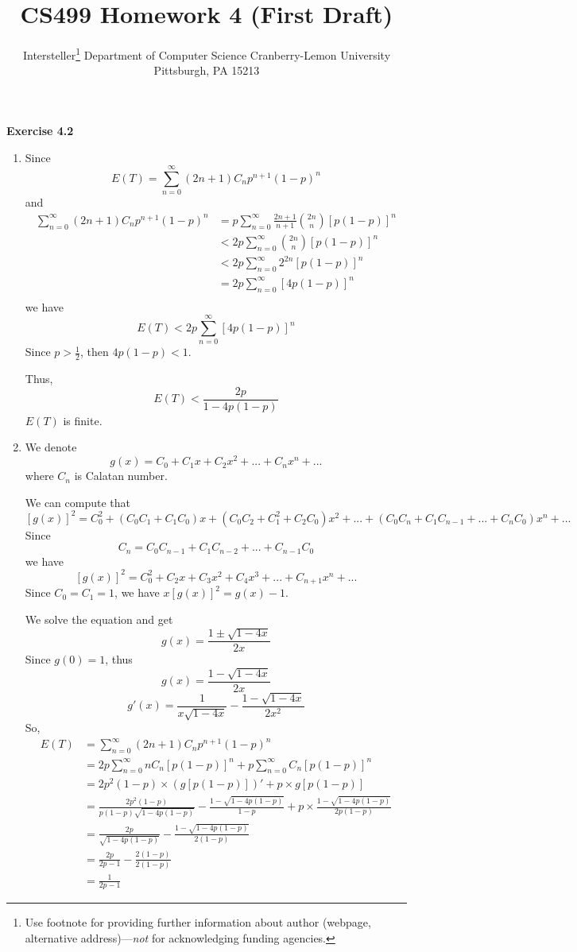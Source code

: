 \documentclass{article} %
\title{CS499 Homework 4 (First Draft)}
\author{
	Intersteller\thanks{ Use footnote for providing further information
		about author (webpage, alternative address)---\emph{not} for acknowledging
		funding agencies.}
	Department of Computer Science
	Cranberry-Lemon University
	Pittsburgh, PA 15213
}
\begin{document}
	\textbf{Exercise 4.2}\par
	\begin{enumerate}
	\item Since $$E(T)=\sum_{n=0}^\infty (2n+1)C_{n}p^{n+1}(1-p)^{n}$$
	and
	\begin{align*}
	\sum_{n=0}^\infty (2n+1)C_{n}p^{n+1}(1-p)^{n}&=p\sum_{n=0}^\infty \frac{2n+1}{n+1} \binom{2n}{n}[p(1-p)]^{n}\\
	&<2p\sum_{n=0}^\infty \binom{2n}{n}[p(1-p)]^{n}\\
	&<2p\sum_{n=0}^\infty 2^{2n}[p(1-p)]^{n}\\
	&=2p\sum_{n=0}^\infty [4p(1-p)]^{n}\\
	\end{align*}
	we have $$E(T)<2p\sum_{n=0}^\infty [4p(1-p)]^{n}$$
	Since $p>\frac{1}{2}$, then $4p(1-p)<1$.\par
	Thus, $$E(T)<\frac{2p}{1-4p(1-p)}$$ $E(T)$ is finite.
	\item We denote $$g(x)=C_0+C_1x+C_2x^2+...+C_{n}x^{n}+...$$ where $C_{n}$ is Calatan number.\par
	We can compute that $$[g(x)]^2=C_0^2+(C_0C_1+C_1C_0)x+(C_0C_2+C_1^2+C_2C_0)x^2+...+(C_0C_{n}+C_1C_{n-1}+...+C_{n}C_0)x^{n}+...$$
	Since $$C_{n}=C_0C_{n-1}+C_1C_{n-2}+...+C_{n-1}C_0$$
	we have $$[g(x)]^2=C_0^2+C_2x+C_3x^2+C_4x^3+...+C_{n+1}x^{n}+...$$
	Since $C_0=C_1=1$, we have $x[g(x)]^2=g(x)-1$.\par
	We solve the equation and get
	$$g(x)=\frac{1\pm\sqrt{1-4x}}{2x}$$
	Since $g(0)=1$, thus 
	$$g(x)=\frac{1-\sqrt{1-4x}}{2x}$$
	$$g'(x)=\frac{1}{x\sqrt{1-4x}}-\frac{1-\sqrt{1-4x}}{2x^2}$$
	So,
	\begin{align*}
	E(T)&=\sum_{n=0}^\infty (2n+1)C_{n}p^{n+1}(1-p)^{n}\\
	&=2p\sum_{n=0}^\infty nC_{n}[p(1-p)]^{n}+p\sum_{n=0}^\infty C_{n}[p(1-p)]^{n}\\
	&=2p^2(1-p)\times (g[p(1-p)])'+p\times g[p(1-p)]\\
	&=\frac{2p^2(1-p)}{p(1-p)\sqrt{1-4p(1-p)}}-\frac{1-\sqrt{1-4p(1-p)}}{1-p}+p\times \frac{1-\sqrt{1-4p(1-p)}}{2p(1-p)}\\
	&=\frac{2p}{\sqrt{1-4p(1-p)}}-\frac{1-\sqrt{1-4p(1-p)}}{2(1-p)}\\
	&=\frac{2p}{2p-1}-\frac{2(1-p)}{2(1-p)}\\
	&=\frac{1}{2p-1}
	\end{align*}
	\end{enumerate}
	
\end{document}
